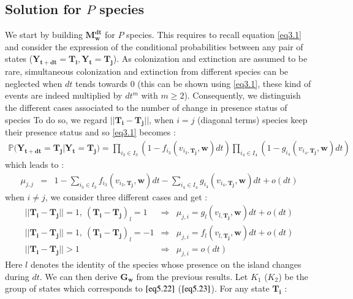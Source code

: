 \subsection{Solution for $P$ species}

We start by building $\mathbf{M_w^{dt}}$ for $P$ species. This requires to recall equation \eqref{eq3.1} and consider the expression of the conditional probabilities between any pair of states ($\mathbf{Y_{t+dt}}=\mathbf{T_i},\mathbf{Y_t}=\mathbf{T_j}$). As colonization and extinction are assumed to be rare, simultaneous colonization and extinction from different species can be neglected when $dt$ tends towards 0 (this can be shown using \eqref{eq3.1}, these kind of events are indeed multiplied by $dt^m$ with $m\geqslant2$). Consequently, we distinguish the different cases associated to the number of change in presence status of species To do so, we regard $||\mathbf{T_i}-\mathbf{T_j}||$, when $i=j$ (diagonal terms) species keep their presence status and so \eqref{eq3.1} becomes :
\begin{eqnarray}
\mathbb{P}(\mathbf{Y_{t+dt}=\mathbf{T_j} | \mathbf{Y_{t}=\mathbf{T_j})}} = \prod_{i_3 \in I_3}(1-f_{i_3}(v_{i_3,\mathbf{T_j}}, \mathbf{w})dt)\prod_{i_4 \in I_4}(1-g_{i_4}(v_{i_4,\mathbf{T_j}}, \mathbf{w})dt)
\end{eqnarray}
which leads to :
\begin{eqnarray}
\mu_{j,j} &=& 1-\sum_{i_3 \in I_3}f_{i_3}(v_{i_3,\mathbf{T_j}}, \mathbf{w})dt- \sum_{i_4 \in I_4}g_{i_4}(v_{i_4,\mathbf{T_j}}, \mathbf{w})dt+o(dt)
\end{eqnarray}
when $i\neq j$, we consider three different cases and get  :
\begin{eqnarray}
\label{eq5.22} ||\mathbf{T_i}-\mathbf{T_j}|| = 1, ~(\mathbf{T_i}-\mathbf{T_j})_l=1 &\Rightarrow& \mu_{j,i}= g_l(v_{l,\mathbf{T_j}}, \mathbf{w})dt+ o(dt) \\
\label{eq5.23} ||\mathbf{T_i}-\mathbf{T_j}||  =1  , ~(\mathbf{T_i}-\mathbf{T_j})_l=-1 &\Rightarrow& \mu_{j,i}= f_l(v_{l,\mathbf{T_j}}, \mathbf{w})dt+o(dt) \\
||\mathbf{T_i}-\mathbf{T_j}||  >1 &\Rightarrow& \mu_{j,i}=o(dt)
\end{eqnarray}
Here $l$ denotes the identity of the species whose presence on the island changes during $dt$. We can then derive $\mathbf{G_w}$ from the previous results. Let $K_1$ ($K_2$) be the group of states which corresponds to $\eqref{eq5.22}$ ($\eqref{eq5.23}$). For any state $\mathbf{T_i}$ :
